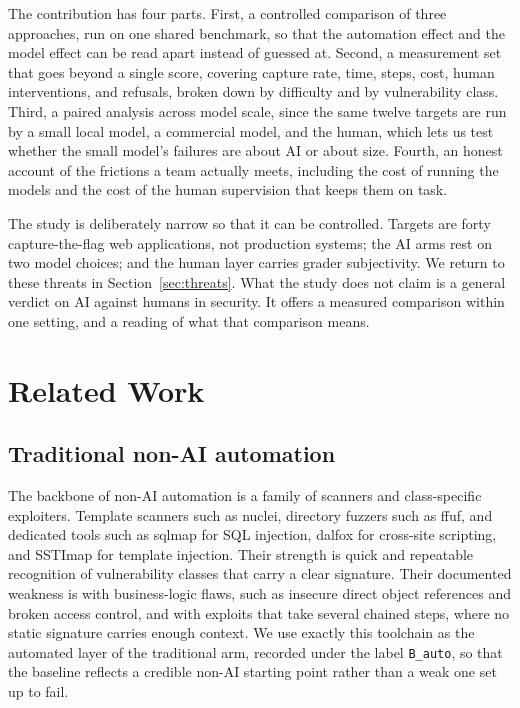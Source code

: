 \documentclass[11pt]{article}
\begin{document}
The contribution has four parts. First, a controlled comparison of three approaches, run on one shared benchmark, so that the automation effect and the model effect can be read apart instead of guessed at. Second, a measurement set that goes beyond a single score, covering capture rate, time, steps, cost, human interventions, and refusals, broken down by difficulty and by vulnerability class. Third, a paired analysis across model scale, since the same twelve targets are run by a small local model, a commercial model, and the human, which lets us test whether the small model's failures are about AI or about size. Fourth, an honest account of the frictions a team actually meets, including the cost of running the models and the cost of the human supervision that keeps them on task.

The study is deliberately narrow so that it can be controlled. Targets are forty capture-the-flag web applications, not production systems; the AI arms rest on two model choices; and the human layer carries grader subjectivity. We return to these threats in Section~\ref{sec:threats}. What the study does not claim is a general verdict on AI against humans in security. It offers a measured comparison within one setting, and a reading of what that comparison means.

\section{Related Work}

\subsection{Traditional non-AI automation}
The backbone of non-AI automation is a family of scanners and class-specific exploiters. Template scanners such as nuclei, directory fuzzers such as ffuf, and dedicated tools such as sqlmap for SQL injection, dalfox for cross-site scripting, and SSTImap for template injection. Their strength is quick and repeatable recognition of vulnerability classes that carry a clear signature. Their documented weakness is with business-logic flaws, such as insecure direct object references and broken access control, and with exploits that take several chained steps, where no static signature carries enough context. We use exactly this toolchain as the automated layer of the traditional arm, recorded under the label \texttt{B\_auto}, so that the baseline reflects a credible non-AI starting point rather than a weak one set up to fail.
\end{document}
